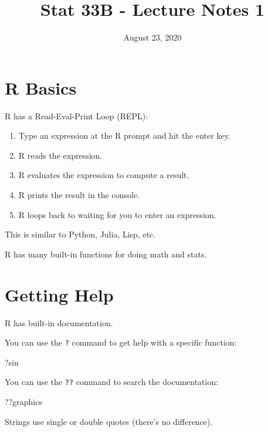 \documentclass[
]{article}
\title{Stat 33B - Lecture Notes 1}
\author{}
\date{\vspace{-2.5em}August 23, 2020}
\newenvironment{Shaded}{\begin{snugshade}}{\end{snugshade}}
\newcommand{\NormalTok}[1]{#1}
\providecommand{\tightlist}{%
  \setlength{\itemsep}{0pt}\setlength{\parskip}{0pt}}
\begin{document}
\maketitle

\hypertarget{r-basics}{%
\section{R Basics}\label{r-basics}}

R has a Read-Eval-Print Loop (REPL):

\begin{enumerate}
\def\labelenumi{\arabic{enumi}.}
\tightlist
\item
  Type an expression at the R prompt and hit the enter key.
\item
  R reads the expression.
\item
  R evaluates the expression to compute a result.
\item
  R prints the result in the console.
\item
  R loops back to waiting for you to enter an expression.
\end{enumerate}

This is similar to Python, Julia, Lisp, etc.

R has many built-in functions for doing math and stats.

\hypertarget{getting-help}{%
\section{Getting Help}\label{getting-help}}

R has built-in documentation.

You can use the \texttt{?} command to get help with a specific function:

\begin{Shaded}
\begin{Highlighting}[]
\NormalTok{?sin}
\end{Highlighting}
\end{Shaded}

You can use the \texttt{??} command to search the documentation:

\begin{Shaded}
\begin{Highlighting}[]
\NormalTok{??graphics}
\end{Highlighting}
\end{Shaded}

Strings use single or double quotes (there's no difference).
\end{document}

